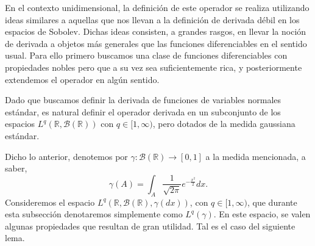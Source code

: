 \documentclass[letterpaper,twoside,12pt]{book}
\newcommand{\R}{\mathbb{R}}
\newcommand{\B}{\mathcal{B}}
\newcommand{\1}{\mathds{1}}
\renewcommand{\to}{\rightarrow}
\theoremstyle{definition}
\theoremstyle{definition}
\theoremstyle{remark}
\theoremstyle{definition}
\theoremstyle{definition}
\theoremstyle{definition}
\theoremstyle{definition}
\theoremstyle{definition}
\begin{document}
En el contexto unidimensional, la definición de este operador se realiza utilizando ideas similares a aquellas que nos llevan a la definición de derivada débil en los espacios de Sobolev. Dichas ideas consisten, a grandes rasgos, en llevar la noción de derivada a objetos más generales que las funciones diferenciables en el sentido usual. Para ello primero buscamos una clase de funciones diferenciables con propiedades nobles pero que a su vez sea suficientemente rica, y posteriormente extendemos el operador en algún sentido.

Dado que buscamos definir la derivada de funciones de variables normales estándar, es natural definir el operador derivada en un subconjunto de los espacios $L^q(\R,\B(\R))$ con $q\in [1,\infty)$, pero dotados de la medida gaussiana estándar. 

Dicho lo anterior, denotemos por $\gamma:\B(\R)\to [0,1]$ a la medida mencionada, a saber, 
\[
\gamma(A)=\int_A\frac{1}{\sqrt{2\pi}}e^{-\frac{x^2}{2}}dx.    
\]
Consideremos el espacio $L^{q}(\R,\B(\R),\gamma(dx))$, con $q\in [1,\infty)$, que durante esta subsección denotaremos simplemente como $L^{q}(\gamma)$. En este espacio, se valen algunas propiedades que resultan de gran utilidad. Tal es el caso del siguiente lema.
\end{document}
